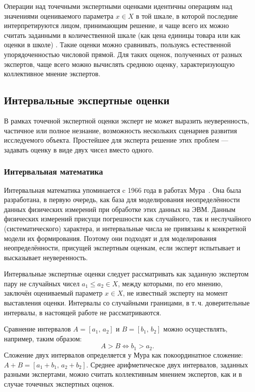 Операции над точечными экспертными оценками идентичны операциям над значениями оцениваемого параметра  $x \in X$  в той шкале, в которой последние интерпретируются лицом, принимающим решение, и чаще всего их можно считать заданными в количественной шкале (как цена единицы товара или как оценки в школе) \cite{Mirkin}. Такие оценки можно сравнивать, пользуясь естественной упорядоченностью числовой прямой. Для таких оценок, полученных от разных экспертов, чаще всего можно вычислять среднюю оценку, характеризующую коллективное мнение экспертов. 

\subsection{Интервальные экспертные оценки}

В рамках точечной экспертной оценки эксперт не может выразить неуверенность, частичное или полное незнание, возможность нескольких сценариев развития исследуемого объекта. Простейшее для эксперта решение этих проблем --- задавать оценку в виде двух чисел вместо одного.

\subsubsection{Интервальная математика}

Интервальная математика упоминается c 1966 года в работах Мура~\cite{moore1966interval, moore2009introduction}. Она была разработана, в первую очередь, как база для моделирования неопределённости данных физических измерений при обработке этих данных на ЭВМ. Данным физических измерений присущи погрешности как случайного, так и неслучайного (систематического) характера, и интервальные числа не привязаны к конкретной модели их формирования. Поэтому они подходят и для моделирования неопределённости, присущей экспертным оценкам, если эксперт испытывает и высказывает неуверенность. 

Интервальные экспертные оценки следует рассматривать как заданную экспертом пару не случайных чисел $a_1 \leq a_2 \in X$, между которыми, по его мнению, заключён оцениваемый параметр $x \in X$, не известный эксперту на момент выставления оценки.  Интервалы со случайными границами, в т.\,ч. доверительные интервалы, в настоящей работе не рассматриваются.

Сравнение интервалов $A = [a_1,\,a_2]$ и $B = [b_1,\,b_2]$ можно осуществлять, например, таким образом:
\begin{equation*}
    A > B \Leftrightarrow b_1 > a_2. 
\end{equation*}
Сложение двух интервалов  определяется у Мура как покоординатное сложение: $A + B = [a_1+b_1,\,a_2+b_2]$. Среднее арифметическое двух интервалов, заданных разными экспертами, можно считать коллективным мнением экспертов, как и в случае точечных экспертных оценок.

